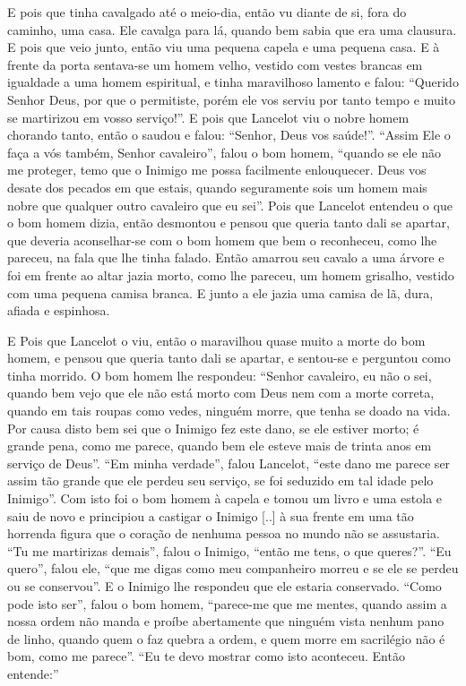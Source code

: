 E pois que tinha cavalgado até o meio-dia, então vu diante de si, fora do
caminho, uma casa. Ele cavalga para lá, quando bem sabia que era uma clausura.
E pois que veio junto, então viu uma pequena capela e uma pequena casa. E à
frente da porta sentava-se um homem velho, vestido com vestes brancas em
igualdade a uma homem espiritual, e tinha maravilhoso lamento e falou: “Querido
Senhor Deus, por que o permitiste, porém ele vos serviu por tanto tempo e muito
se martirizou em vosso serviço!”. E pois que Lancelot viu o nobre homem
chorando tanto, então o saudou e falou: “Senhor, Deus vos saúde!”. “Assim Ele o
faça a vós também, Senhor cavaleiro”, falou o bom homem, “quando se ele não me
proteger, temo que o Inimigo me possa facilmente enlouquecer. Deus vos desate
dos pecados em que estais, quando seguramente sois um homem mais nobre que
qualquer outro cavaleiro que eu sei”. Pois que Lancelot entendeu o que o bom
homem dizia, então desmontou e pensou que queria tanto dali se apartar, que
deveria aconselhar-se com o bom homem que bem o reconheceu, como lhe pareceu,
na fala que lhe tinha falado. Então amarrou seu cavalo a uma árvore e foi em
frente ao altar jazia morto, como lhe pareceu, um homem grisalho, vestido com
uma pequena camisa branca. E junto a ele jazia uma camisa de lã, dura, afiada e
espinhosa. 

E Pois que Lancelot o viu, então o maravilhou quase muito a morte do bom
homem, e pensou que queria tanto dali se apartar, e sentou-se e perguntou como
tinha morrido. O bom homem lhe respondeu: “Senhor cavaleiro, eu não o sei,
quando bem vejo que ele não está morto com Deus nem com a morte correta, quando
em tais roupas como vedes, ninguém morre, que tenha se doado na vida. Por causa
disto bem sei que o Inimigo fez este dano, se ele estiver morto; é grande pena,
como me parece, quando bem ele esteve mais de trinta anos em serviço de Deus”.
“Em minha verdade”, falou Lancelot, “este dano me parece ser assim tão grande
que ele perdeu seu serviço, se foi seduzido em tal idade pelo Inimigo”. Com
isto foi o bom homem à capela e tomou um livro e uma estola e saiu de novo e
principiou a castigar o Inimigo [..] à sua frente em uma tão horrenda figura
que o coração de nenhuma pessoa no mundo não se assustaria. “Tu me martirizas
demais”, falou o Inimigo, “então me tens, o que queres?”. “Eu quero”, falou
ele, “que me digas como meu companheiro morreu e se ele se perdeu ou se
conservou”. E o Inimigo lhe respondeu que ele estaria conservado. “Como pode
isto ser”, falou o bom homem, “parece-me que me mentes, quando assim a nossa
ordem não manda e proíbe abertamente que ninguém vista nenhum pano de linho,
quando quem o faz quebra a ordem, e quem morre em sacrilégio não é bom, como me
parece”. “Eu te devo mostrar como isto aconteceu. Então entende:”

